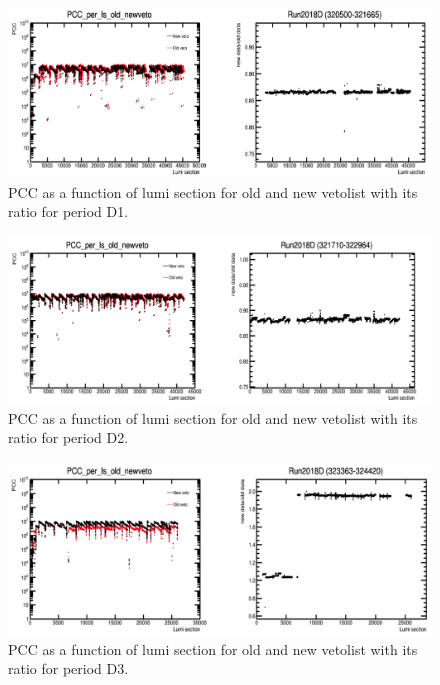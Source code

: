 \begin{figure}[!htp]
\centering
\includegraphics[width=1\textwidth]{ashish_thesis/Run2018D1_old_new_veto.png}
\caption{%
    PCC as a function of lumi section for old and new vetolist with its ratio for period D1.
}
\label{fig:old_new_veto_D1}
\end{figure}

\begin{figure}[!htp]
\centering
\includegraphics[width=1\textwidth]{ashish_thesis/Run2018D2_old_new_veto.png}
\caption{%
   PCC as a function of lumi section for old and new vetolist with its ratio for period D2.
}
\label{fig:old_new_veto_D2}
\end{figure}

\begin{figure}[!htp]
\centering
\includegraphics[width=1\textwidth]{ashish_thesis/Run2018D3_old_new_veto.png}
\caption{%
    PCC as a function of lumi section for old and new vetolist with its ratio for period D3.
}
\label{fig:old_new_veto_D3}
\end{figure}

